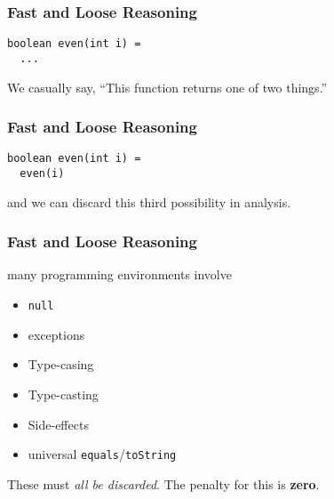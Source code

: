 \begin{frame}[fragile]
\frametitle{Fast and Loose Reasoning}
\begin{lstlisting}
boolean even(int i) =
  ...
\end{lstlisting}
We casually say, ``This function returns one of two things.''
\end{frame}

\begin{frame}[fragile]
\frametitle{Fast and Loose Reasoning}
\begin{lstlisting}
boolean even(int i) =
  even(i)
\end{lstlisting}
and we can discard this third possibility in analysis.
\end{frame}

\begin{frame}[fragile]
\frametitle{Fast and Loose Reasoning}
\begin{block}{many programming environments involve}
\begin{itemize}
  \item \lstinline{null}
  \item exceptions
  \item Type-casing
  \item Type-casting
  \item Side-effects
  \item universal \lstinline{equals}/\lstinline{toString}
\end{itemize}
\end{block}
These must \emph{all be discarded}. The penalty for this is \textbf{zero}.
\end{frame}
